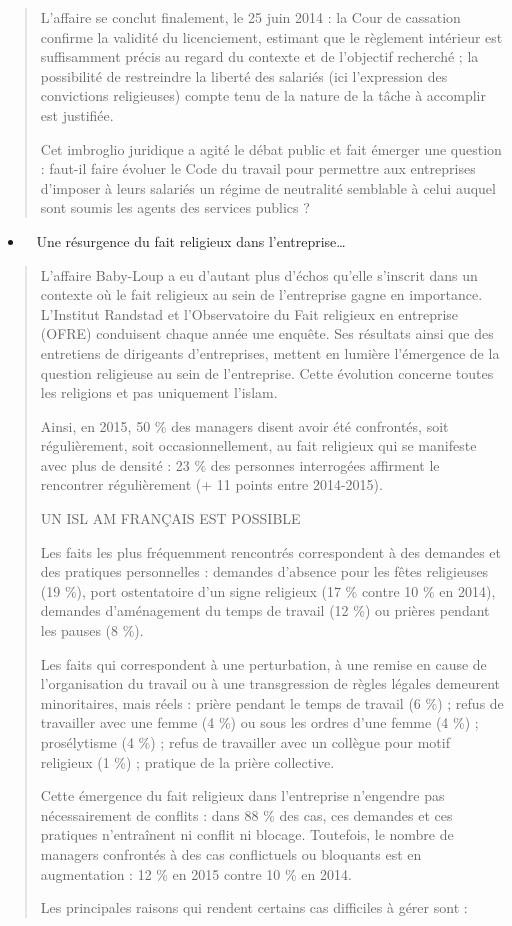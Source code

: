 \begin{quote}
L'affaire se conclut finalement, le 25 juin 2014 : la Cour de cassation
confirme la validité du licenciement, estimant que le règlement
intérieur est suffisamment précis au regard du contexte et de l'objectif
recherché ; la possibilité de restreindre la liberté des salariés (ici
l'expression des convictions religieuses) compte tenu de la nature de la
tâche à accomplir est justifiée.

Cet imbroglio juridique a agité le débat public et fait émerger une
question : faut-il faire évoluer le Code du travail pour permettre aux
entreprises d'imposer à leurs salariés un régime de neutralité semblable
à celui auquel sont soumis les agents des services publics ?
\end{quote}

\begin{itemize}
\item ~
  Une résurgence du fait religieux dans l'entreprise\ldots{}
\end{itemize}

\begin{quote}
L'affaire Baby-Loup a eu d'autant plus d'échos qu'elle s'inscrit dans un
contexte où le fait religieux au sein de l'entreprise gagne en
importance. L'Institut Randstad et l'Observatoire du Fait religieux en
entreprise (OFRE) conduisent chaque année une enquête. Ses résultats
ainsi que des entretiens de dirigeants d'entreprises, mettent en lumière
l'émergence de la question religieuse au sein de l'entreprise. Cette
évolution concerne toutes les religions et pas uniquement l'islam.

Ainsi, en 2015, 50 \% des managers disent avoir été confrontés, soit
régulièrement, soit occasionnellement, au fait religieux qui se
manifeste avec plus de densité : 23 \% des personnes interrogées
affirment le rencontrer régulièrement (+ 11 points entre 2014-2015).

UN ISL AM FRANÇAIS EST POSSIBLE

Les faits les plus fréquemment rencontrés correspondent à des demandes
et des pratiques personnelles : demandes d'absence pour les fêtes
religieuses (19 \%), port ostentatoire d'un signe religieux (17 \%
contre 10 \% en 2014), demandes d'aménagement du temps de travail (12
\%) ou prières pendant les pauses (8 \%).

Les faits qui correspondent à une perturbation, à une remise en cause de
l'organisation du travail ou à une transgression de règles légales
demeurent minoritaires, mais réels : prière pendant le temps de travail
(6 \%) ; refus de travailler avec une femme (4 \%) ou sous les ordres
d'une femme (4 \%) ; prosélytisme (4 \%) ; refus de travailler avec un
collègue pour motif religieux (1 \%) ; pratique de la prière collective.

Cette émergence du fait religieux dans l'entreprise n'engendre pas
nécessairement de conflits : dans 88 \% des cas, ces demandes et ces
pratiques n'entraînent ni conflit ni blocage. Toutefois, le nombre de
managers confrontés à des cas conflictuels ou bloquants est en
augmentation : 12 \% en 2015 contre 10 \% en 2014.

Les principales raisons qui rendent certains cas difficiles à gérer sont
:
\end{quote}

